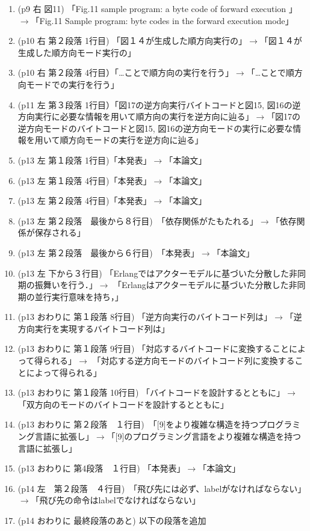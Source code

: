 \documentclass[a4j]{jarticle}
\begin{document}
\begin{enumerate}
\item (p9 右 図11)  「Fig.11 sample program: a byte code of forward execution 」$\rightarrow$「Fig.11 Sample program: byte codes in the forward execution mode」
\item (p10 右 第２段落 1行目) 「図１４が生成した順方向実行の」$\rightarrow$「図１４が生成した順方向モード実行の」
\item (p10 右 第２段落 4行目）「…ことで順方向の実行を行う」$\rightarrow$「…ことで順方向モードでの実行を行う」
\item (p11 左 第３段落 1行目）「図17の逆方向実行バイトコードと図15, 図16の逆方向実行に必要な情報を用いて順方向の実行を逆方向に辿る」$\rightarrow$「図17の逆方向モードのバイトコードと図15, 図16の逆方向モードの実行に必要な情報を用いて順方向モードの実行を逆方向に辿る」
\item (p13 左 第１段落 1行目)「本発表」$\rightarrow$「本論文」
\item (p13 左 第１段落 4行目)「本発表」$\rightarrow$「本論文」
\item (p13 左 第２段落 4行目)「本発表」$\rightarrow$「本論文」
\item (p13 左 第２段落　最後から８行目)　「依存関係がたもたれる」$\rightarrow$「依存関係が保存される」
\item (p13 左 第２段落　最後から６行目)　「本発表」$\rightarrow$「本論文」
\item (p13 左 下から３行目) 「Erlangではアクターモデルに基づいた分散した非同期の振舞いを行う．」$\rightarrow$
「Erlangはアクターモデルに基づいた分散した非同期の並行実行意味を持ち，」
\item (p13 おわりに 第１段落 8行目) 「逆方向実行のバイトコード列は」$\rightarrow$「逆方向実行を実現するバイトコード列は」
\item (p13 おわりに 第１段落 9行目) 「対応するバイトコードに変換することによって得られる」$\rightarrow$
「対応する逆方向モードのバイトコード列に変換することによって得られる」
\item (p13 おわりに 第１段落 10行目) 「バイトコードを設計するとともに」$\rightarrow$「双方向のモードのバイトコードを設計するとともに」
\item (p13 おわりに 第２段落　１行目)　「[9]をより複雑な構造を持つプログラミング言語に拡張し」$\rightarrow$「[9]のプログラミング言語をより複雑な構造を持つ言語に拡張し」
\item (p13 おわりに 第4段落　１行目) 「本発表」$\rightarrow$「本論文」
\item (p14 左　第２段落　４行目)　「飛び先には必ず、labelがなければならない」$\rightarrow$「飛び先の命令はlabelでなければならない」
\item (p14 おわりに 最終段落のあと) 以下の段落を追加\\


\end{enumerate}
\end{document}
